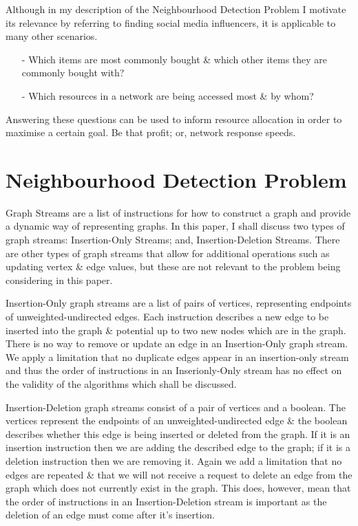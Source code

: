 \documentclass[11pt,twoside,a4paper]{report}
\begin{document}
\par Although in my description of the Neighbourhood Detection Problem I motivate its relevance by referring to finding social media influencers, it is applicable to many other scenarios.
\begin{itemize}
	\item[-] Which items are most commonly bought \& which other items they are commonly bought with?
	\item[-] Which resources in a network are being accessed most \& by whom?
\end{itemize}
Answering these questions can be used to inform resource allocation in order to maximise a certain goal. Be that profit; or, network response speeds.
\section{Neighbourhood Detection Problem}
\par Graph Streams are a list of instructions for how to construct a graph and provide a dynamic way of representing graphs. In this paper, I shall discuss two types of graph streams: Insertion-Only Streams; and, Insertion-Deletion Streams. There are other types of graph streams that allow for additional operations such as updating vertex \& edge values, but these are not relevant to the problem being considering in this paper.
\par Insertion-Only graph streams are a list of pairs of vertices, representing endpoints of unweighted-undirected edges. Each instruction describes a new edge to be inserted into the graph \& potential up to two new nodes which are in the graph. There is no way to remove or update an edge in an Insertion-Only graph stream. We apply a limitation that no duplicate edges appear in an insertion-only stream and thus the order of instructions in an Inserionly-Only stream has no effect on the validity of the algorithms which shall be discussed.
\par Insertion-Deletion graph streams consist of a pair of vertices and a boolean. The vertices represent the endpoints of an unweighted-undirected edge \& the boolean describes whether this edge is being inserted or deleted from the graph. If it is an insertion instruction then we are adding the described edge to the graph; if it is a deletion instruction then we are removing it. Again we add a limitation that no edges are repeated \& that we will not receive a request to delete an edge from the graph which does not currently exist in the graph. This does, however, mean that the order of instructions in an Insertion-Deletion stream is important as the deletion of an edge must come after it's insertion.
\end{document}

